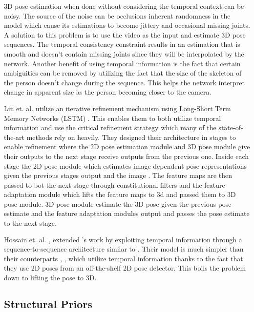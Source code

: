 3D pose estimation when done without considering the temporal context can be noisy. The source of the noise can be occlusions inherent randomness in the model which cause its estimations to become jittery and occasional missing joints. A solution to this problem is to use the video as the input and estimate 3D pose sequences. The temporal consistency constraint results in an estimation that is smooth and doesn't contain missing joints since they will be interpolated by the network. Another benefit of using temporal information is the fact that certain ambiguities can be removed by utilizing the fact that the size of the skeleton of the person doesn't change during the sequence. This helps the network interpret change in apparent size as the person becoming closer to the camera.

Lin et. al. \parencite{lin2017recurrent} utilize an iterative refinement mechanism using Long-Short Term Memory Networks (LSTM) \parencite{hochreiter1997long}. This enables them to both utilize temporal information and use the critical refinement strategy which many of the state-of-the-art methods rely on heavily. They designed their architecture in stages to enable refinement where the 2D pose estimation module and 3D pose module give their outputs to the next stage receive outputs from the previous one. Inside each stage the 2D pose module which estimates image dependent pose representations given the previous stages output and the image . The feature maps are then passed to bot the next stage through constitutional filters and the feature adaptation module which lifts the feature maps to 3d and passed them to 3D pose module. 3D pose module estimate the 3D pose given the previous pose estimate and the feature adaptation modules output and passes the pose estimate to the next stage.

Hossain et. al. \parencite{hossain2017exploiting}, \parencite{hossain2017understanding} extended \parencite{martinez2017simple}'s work by exploiting temporal information through a sequence-to-sequence architecture similar to \parencite{sutskever2014sequence}. Their model is much simpler than their counterparts \parencite{lin2017recurrent}, \parencite{bogo2016keep}, \parencite{mehta2017vnect} which utilize temporal information thanks to the fact that they use 2D poses from an off-the-shelf 2D pose detector. This boils the problem down to lifting the pose to 3D.

\subsection{Structural Priors}

